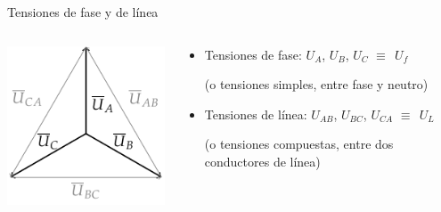 \documentclass[aspectratio=169, usenames,svgnames,dvipsnames]{beamer}
\begin{document}

\begin{frame}{Tensiones de fase y de línea} \label{diapo:triangulos_fase_linea}

\vspace{7mm}
    \begin{columns}
    \begin{column}{0.35\columnwidth}
        \hspace*{8mm}
            \includegraphics[height=0.5\textheight]{../figs/FasoresTrifasica_ABC.pdf}
    \end{column}
    
    \begin{column}{0.65\columnwidth}

        \vspace{-6mm}
        \begin{itemize}
            \item Tensiones de \alert{fase}: \hspace{4mm}\(U_A\), \(U_B\), \(U_C\) \hspace{1mm} $\equiv \;\, U_f$

            \vspace{1mm}
            \small{(o tensiones \alert{simples}, entre fase y neutro)}
    
            \normalsize
            \vspace{5mm}
            \item Tensiones de \alert{línea}: \hspace{1.5mm} \(U_{AB}\), \(U_{BC}\), \(U_{CA}\) \hspace{1mm} $\equiv \;\, U_L$
    
            \vspace{1mm}
            \small{(o tensiones \alert{compuestas}, entre dos conductores de línea)}
    
            \normalsize
        \end{itemize}        
    \end{column}
    \end{columns}


\end{frame}
\end{document}
